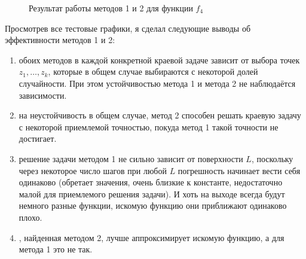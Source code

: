 \documentclass[a4paper, 12pt]{article}
\begin{document}
            \begin{figure}[h!]
              \caption{Результат работы методов 1 и 2 для функции $f_4$}
              \label{send}
            \end{figure}

\FloatBarrier           
Просмотрев все тестовые графики, я сделал следующие выводы об эффективности методов 1 и 2:
\begin{enumerate}
  \item { обоих методов в каждой конкретной краевой задаче зависит от выбора точек $z_1, \dots, z_k$}, которые в общем случае выбираются с некоторой долей случайности. При этом { устойчивостью метода 1 и метода 2 не наблюдаётся зависимости}.
  \item { на неустойчивость в общем случае, метод 2 способен решать краевую задачу с некоторой приемлемой точностью, покуда метод 1 такой точности не достигает}.
  \item { решение задачи методом 1 не сильно зависит от поверхности $L$, поскольку через некоторое число шагов при любой $L$ погрешность начинает вести себя одинаково} (обретает значения, очень близкие к константе, недостаточно малой для приемлемого решения задачи). И хоть на выходе всегда будут немного разные функции, искомую функцию они приближают одинаково плохо.
  \item {, найденная методом 2, лучше аппроксимирует искомую функцию, а для метода 1 это не так}.
\end{enumerate}
\end{document}
